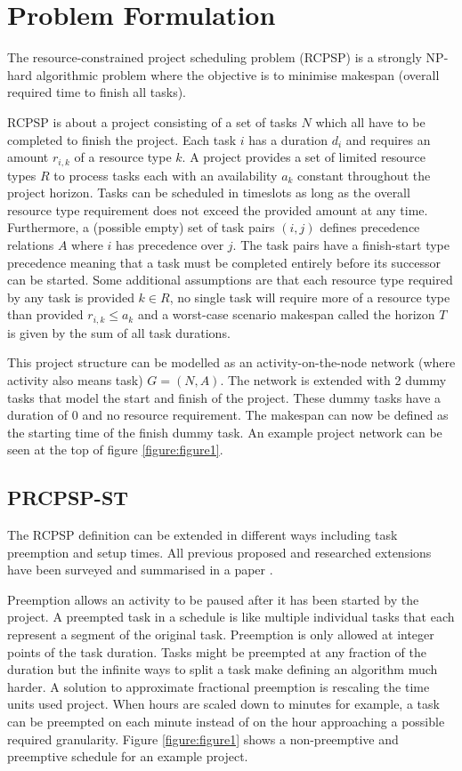 \section{Problem Formulation} \label{section:problem_formulation}
The resource-constrained project scheduling problem (RCPSP) is a strongly NP-hard algorithmic problem \cite{RN20} where the objective is to minimise makespan (overall required time to finish all tasks). 

RCPSP is about a project consisting of a set of tasks \(N\) which all have to be completed to finish the project. Each task \(i\) has a duration \(d_i\) and requires an amount \(r_{i,k}\) of a resource type \(k\). A project provides a set of limited resource types \(R\) to process tasks each with an availability \(a_k\) constant throughout the project horizon. Tasks can be scheduled in timeslots as long as the overall resource type requirement does not exceed the provided amount at any time. Furthermore, a (possible empty) set of task pairs \((i,j)\) defines precedence relations \(A\) where \(i\) has precedence over \(j\). The task pairs have a finish-start type precedence meaning that a task must be completed entirely before its successor can be started. Some additional assumptions are that each resource type required by any task is provided \(k\in R\), no single task will require more of a resource type than provided \(r_{i,k}\leq a_k\) and a worst-case scenario makespan called the horizon \(T\) is given by the sum of all task durations.

This project structure can be modelled as an activity-on-the-node network (where activity also means task) \(G=(N, A)\). The network is extended with 2 dummy tasks that model the start and finish of the project. These dummy tasks have a duration of 0 and no resource requirement. The makespan can now be defined as the starting time of the finish dummy task. An example project network can be seen at the top of figure \ref{figure:figure1}.

\subsection{PRCPSP-ST}
The RCPSP definition can be extended in different ways including task preemption and setup times. All previous proposed and researched extensions have been surveyed and summarised in a paper \cite{RN6, RN27}.

Preemption allows an activity to be paused after it has been started by the project. A preempted task in a schedule is like multiple individual tasks that each represent a segment of the original task. Preemption is only allowed at integer points of the task duration. Tasks might be preempted at any fraction of the duration but the infinite ways to split a task make defining an algorithm much harder. A solution to approximate fractional preemption is rescaling the time units used project. When hours are scaled down to minutes for example, a task can be preempted on each minute instead of on the hour approaching a possible required granularity. Figure \ref{figure:figure1} shows a non-preemptive and preemptive schedule for an example project.

